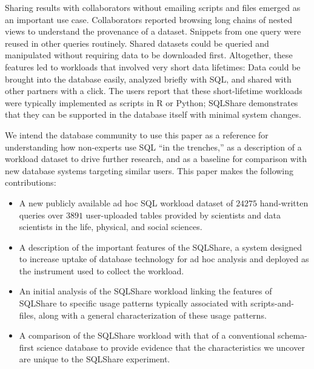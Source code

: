\documentclass{sig-alternate}
\newcommand{\sqlshare}{SQLShare}
\begin{document}
Sharing results with collaborators without emailing scripts and files emerged as an important use case.  Collaborators reported browsing long chains of nested views to understand the provenance of a dataset.  Snippets from one query were reused in other queries routinely.  Shared datasets could be queried and manipulated without requiring data to be downloaded first.  Altogether, these features led to workloads that involved very short data lifetimes: Data could be brought into the database easily, analyzed briefly with SQL, and shared with other partners with a click.  The users report that these short-lifetime workloads were typically implemented as scripts in R or Python; \sqlshare{} demonstrates that they can be supported in the database itself with minimal system changes.

We intend the database community to use this paper as a reference for understanding how non-experts use SQL ``in the trenches,'' as a description of a workload dataset to drive further research, and as a baseline for comparison with new database systems targeting similar users.
This paper makes the following contributions:

\begin{itemize}
\itemsep0em
\item A new publicly available ad hoc SQL workload dataset of $24275$ hand-written queries over $3891$ user-uploaded tables provided by scientists and data scientists in the life, physical, and social sciences.
\item A description of the important features of the \sqlshare{}, a system designed to increase uptake of database technology for ad hoc analysis and deployed as the instrument used to collect the workload.
\item An initial analysis of the \sqlshare{} workload linking the features of \sqlshare{} to specific usage patterns typically associated with scripts-and-files, along with a general characterization of these usage patterns.
\item A comparison of the \sqlshare{} workload with that of a conventional schema-first science database to provide evidence that the characteristics we uncover are unique to the \sqlshare{} experiment.
\end{itemize}
\end{document}

